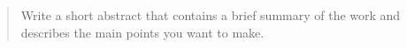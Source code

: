 \begin{abstract}
    Write a short abstract that contains a brief summary of the work and describes the main points you want to make.

\end{abstract}